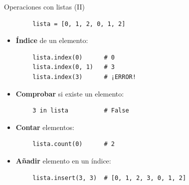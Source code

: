 \documentclass[10pt]{beamer} %
\begin{document}
\begin{frame}[fragile]{Operaciones con listas (II)}
    \begin{verbatim}
        lista = [0, 1, 2, 0, 1, 2]
    \end{verbatim}
    \begin{itemize}
        \item \textbf{Índice} de un elemento:
    \end{itemize}
    \begin{verbatim}
        lista.index(0)      # 0
        lista.index(0, 1)   # 3
        lista.index(3)      # ¡ERROR!
    \end{verbatim}
    \begin{itemize}
        \item \textbf{Comprobar} si existe un elemento:
    \end{itemize}
    \begin{verbatim}
        3 in lista          # False
    \end{verbatim}
    \begin{itemize}
        \item \textbf{Contar} elementos:
    \end{itemize}
    \begin{verbatim}
        lista.count(0)      # 2
    \end{verbatim}
    \begin{itemize}
        \item \textbf{Añadir} elemento en un índice:
    \end{itemize}
    \begin{verbatim}
        lista.insert(3, 3)  # [0, 1, 2, 3, 0, 1, 2]
    \end{verbatim}
\end{frame}
\end{document}
